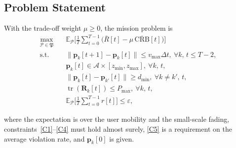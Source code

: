 \documentclass[conference]{IEEEtran}
\begin{document}
\subsection{Problem Statement}

With the trade-off weight $\mu\ge 0$, the mission problem is
\begin{align}
\max_{\mathcal{P}\in\mathfrak P}\quad & \mathbb E_{\mathcal{P}}\Big[\frac1T\sum_{t=0}^{T-1}\Big(\bar R[t]-\mu\,\overline{\mathrm{CRB}}[t]\Big)\Big] \label{opt:main}\\
\text{s.t.}\quad & \|\mathbf p_k[t+1]-\mathbf p_k[t]\|\le v_{\max}\Delta t, \ \forall k,\,t\le T-2, \tag{C1}\label{C1}\\
& \mathbf p_k[t]\in\mathcal A\times[z_{\min},z_{\max}], \ \forall k,\,t, \tag{C2}\label{C2}\\
& \|\mathbf p_k[t]-\mathbf p_{k'}[t]\|\ge d_{\min}, \ \forall k\neq k',\,t, \tag{C3}\label{C3}\\
& \operatorname{tr}(\mathbf R_k[t])\le P_{\max}, \ \forall k,\,t, \tag{C4}\label{C4}\\
& \mathbb E_{\mathcal{P}}\Big[\frac1T\sum_{t=0}^{T-1}r[t]\Big]\le\varepsilon, \tag{C5}\label{C5}
\end{align}

where the expectation is over the user mobility and the small-scale fading, constraints~\eqref{C1}--\eqref{C4} must hold almost surely, \eqref{C5} is a requirement on the average violation rate, and $\mathbf p_k[0]$ is given.
\end{document}
